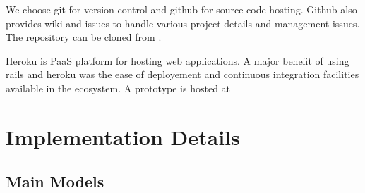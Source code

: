 \documentclass[12pt]{article}
\begin{document}
We choose git for version control and github for source code hosting.
Github also provides wiki and issues to handle various project details
and management issues. The repository can be cloned from \cite{github}.

Heroku is PaaS platform for hosting web applications. A major benefit
of using rails and heroku was the ease of deployement and continuous
integration facilities available in the ecosystem. A prototype is
hosted at \cite{heroku}

\section{Implementation Details}
\subsection{Main Models}
\end{document}
